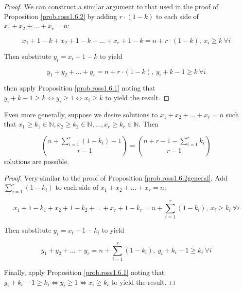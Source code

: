 \begin{proof}
We can construct a similar argument to that used in the proof of Proposition \ref{prob.ross1.6.2} by adding \(r \cdot(1-k) \) to each side of \(x_1 + x_2 + \ldots + x_r = n\):

\[
x_1 + 1 - k + x_2 + 1 - k + \ldots + x_r  + 1 - k= n + r\cdot(1-k), \ x_i \geq k \ \forall i
\]

Then substitute \(y_i = x_i + 1 - k\) to yield 

\[
y_1+ y_2 + \ldots + y_ r = n + r\cdot(1-k), \ y_i + k - 1\geq k \ \forall i
\]

then apply Proposition \ref{prob.ross1.6.1} noting that \(y_i + k - 1\geq k \iff y_i \geq 1 \iff x_i \geq k\) to yield the result.
\end{proof}

\begin{proposition}\label{prob.ross1.6.2.most.general} Even more generally, suppose we desire solutions to \(x_1 + x_2 + \ldots + x_r = n\) such that  \(x_1 \geq k_1 \in \mathbb{N}, x_2 \geq k_2 \in \mathbb{N}, \ldots, x_r \geq k_r \in \mathbb{N}\). Then 

\[
\binom{n +  \sum_{i=1}^r (1 - k_i )-1}{r-1} = \binom{n + r - 1 -  \sum_{i=1}^r  k_i}{r-1}
\] solutions are possible.

\begin{proof}
Very similar to the proof of Proposition \ref{prob.ross1.6.2general}. Add \(\sum_{i=1}^r (1 - k_i ) \) to each side of \(x_1 + x_2 + \ldots + x_r = n\):

\[
x_1 + 1 - k_1 + x_2 + 1 - k_2 + \ldots + x_r  + 1 - k_r = n + \sum_{i=1}^r (1 - k_i ), \ x_i \geq k_i \ \forall i
\]

Then substitute \(y_i = x_i + 1 - k_i\) to yield 

\[
y_1+ y_2 + \ldots + y_ r = n +  \sum_{i=1}^r (1 - k_i ), \ y_i + k_i - 1\geq k_i \ \forall i
\]

Finally, apply Proposition \ref{prob.ross1.6.1} noting that \(y_i + k_i - 1\geq k_i \iff y_i \geq 1 \iff x_i \geq k_i\) to yield the result.
\end{proof}

\end{proposition}

